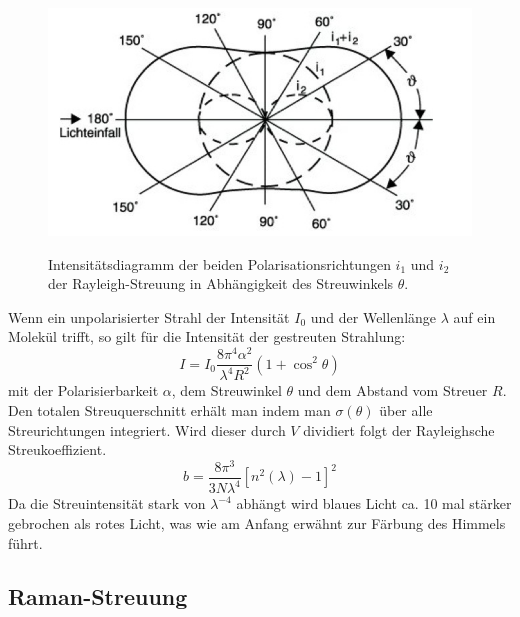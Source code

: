 \documentclass[.../bericht]{subfilies}
\begin{document}
      \begin{figure}[H]
        \begin{center}
          \fbox
          {
          \includegraphics[scale=1]{figures/rstreuung}
          }
          \caption{Intensitätsdiagramm der beiden Polarisationsrichtungen $i_1$ und $i_2$ der Rayleigh-Streuung in Abhängigkeit des Streuwinkels $\theta$. \cite{spektrum:rayleigh}
          }
        \end{center}
      \end{figure}
      Wenn ein unpolarisierter Strahl der Intensität $I_0$ und der Wellenlänge $\lambda$ auf ein Molekül trifft, so gilt für die Intensität der gestreuten Strahlung:
      \begin{equation}
        I=I_0\frac{8\pi^4 \alpha^2}{\lambda^4 R^2}(1+\cos^2\theta)
        \label{eq:rayleighi}
      \end{equation}
      mit der Polarisierbarkeit $\alpha$, dem Streuwinkel $\theta$ und dem Abstand vom Streuer $R$.\\
      Den totalen Streuquerschnitt erhält man indem man $\sigma(\theta)$ über alle Streurichtungen integriert. Wird dieser durch $V$ dividiert folgt der Rayleighsche Streukoeffizient.
      \begin{equation*}
        b=\frac{8\pi^3}{3N\lambda^4}[n^2(\lambda)-1]^2
      \end{equation*}
      Da die Streuintensität stark von $\lambda^{-4}$ abhängt wird blaues Licht ca. 10 mal stärker gebrochen als rotes Licht, was wie am Anfang erwähnt zur Färbung des Himmels führt.

      \cite{cosmos} \cite{wiki:rayleigh} \cite{spektrum:rayleigh}

    \subsection{Raman-Streuung}
    \label{ssec:Raman-Streuung}
\end{document}

